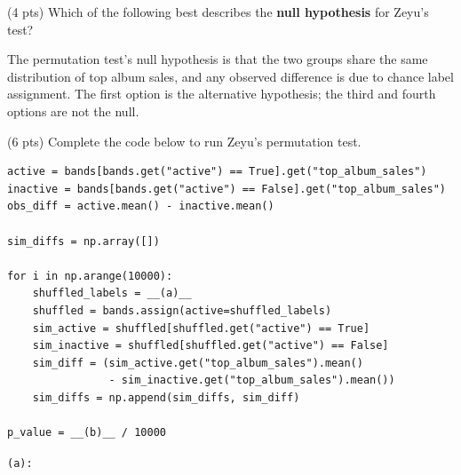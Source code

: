 \documentclass[twoside,12pt]{article}
\begin{document}
\begin{probset}
\begin{prob}[(18 pts)]
\begin{subprobset}

\begin{subprob}(4 pts)
Which of the following best describes the \textbf{null hypothesis} for Zeyu's test?

\smallskip
{}

\smallskip
{}

\smallskip
{}

\smallskip
{}

\begin{soln}
The permutation test's null hypothesis is that the two groups share the same distribution of top album sales, and any observed difference is due to chance label assignment. The first option is the alternative hypothesis; the third and fourth options are not the null.
\end{soln}

\end{subprob}

\bigskip

\begin{subprob}(6 pts)
Complete the code below to run Zeyu's permutation test.

\begin{Verbatim}
active = bands[bands.get("active") == True].get("top_album_sales")
inactive = bands[bands.get("active") == False].get("top_album_sales")
obs_diff = active.mean() - inactive.mean()

sim_diffs = np.array([])

for i in np.arange(10000):
    shuffled_labels = __(a)__
    shuffled = bands.assign(active=shuffled_labels)
    sim_active = shuffled[shuffled.get("active") == True]
    sim_inactive = shuffled[shuffled.get("active") == False]
    sim_diff = (sim_active.get("top_album_sales").mean()
                - sim_inactive.get("top_album_sales").mean())
    sim_diffs = np.append(sim_diffs, sim_diff)

p_value = __(b)__ / 10000
\end{Verbatim}

\smallskip
\texttt{(a):} 


\end{subprob}
\end{subprobset}
\end{prob}
\end{probset}
\end{document}
